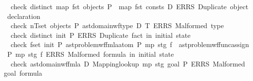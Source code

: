 \begin{isabellebody}
\ \ check\ {\isacharparenleft}{\kern0pt}distinct\ {\isacharparenleft}{\kern0pt}map\ fst\ {\isacharparenleft}{\kern0pt}objects\ P{\isacharparenright}{\kern0pt}\ {\isacharat}{\kern0pt}\ map\ fst\ {\isacharparenleft}{\kern0pt}consts\ D{\isacharparenright}{\kern0pt}{\isacharparenright}{\kern0pt}{\isacharparenright}{\kern0pt}\ {\isacharparenleft}{\kern0pt}ERRS\ {\isacharprime}{\kern0pt}{\isacharprime}{\kern0pt}Duplicate\ object\ declaration{\isacharprime}{\kern0pt}{\isacharprime}{\kern0pt}{\isacharparenright}{\kern0pt}{\isacharsemicolon}{\kern0pt}\isanewline
\ \ check\ {\isacharparenleft}{\kern0pt}{\isacharparenleft}{\kern0pt}{\isasymforall}{\isacharparenleft}{\kern0pt}n{\isacharcomma}{\kern0pt}T{\isacharparenright}{\kern0pt}{\isasymin}set\ {\isacharparenleft}{\kern0pt}objects\ P{\isacharparenright}{\kern0pt}{\isachardot}{\kern0pt}\ ast{\isacharunderscore}{\kern0pt}domain{\isachardot}{\kern0pt}wf{\isacharunderscore}{\kern0pt}type\ D\ T{\isacharparenright}{\kern0pt}{\isacharparenright}{\kern0pt}\ {\isacharparenleft}{\kern0pt}ERRS\ {\isacharprime}{\kern0pt}{\isacharprime}{\kern0pt}Malformed\ type{\isacharprime}{\kern0pt}{\isacharprime}{\kern0pt}{\isacharparenright}{\kern0pt}{\isacharsemicolon}{\kern0pt}\isanewline
\ \ check\ {\isacharparenleft}{\kern0pt}distinct\ {\isacharparenleft}{\kern0pt}init\ P{\isacharparenright}{\kern0pt}{\isacharparenright}{\kern0pt}\ {\isacharparenleft}{\kern0pt}ERRS\ {\isacharprime}{\kern0pt}{\isacharprime}{\kern0pt}Duplicate\ fact\ in\ initial\ state{\isacharprime}{\kern0pt}{\isacharprime}{\kern0pt}{\isacharparenright}{\kern0pt}{\isacharsemicolon}{\kern0pt}\isanewline
\ \ check\ {\isacharparenleft}{\kern0pt}{\isasymforall}f{\isasymin}set\ {\isacharparenleft}{\kern0pt}init\ P{\isacharparenright}{\kern0pt}{\isachardot}{\kern0pt}\ ast{\isacharunderscore}{\kern0pt}problem{\isachardot}{\kern0pt}wf{\isacharunderscore}{\kern0pt}fmla{\isacharunderscore}{\kern0pt}atom{}{\isacharprime}{\kern0pt}\ P\ mp\ stg\ f\ {\isasymor}\ ast{\isacharunderscore}{\kern0pt}problem{\isachardot}{\kern0pt}wf{\isacharunderscore}{\kern0pt}func{\isacharunderscore}{\kern0pt}assign{\isacharprime}{\kern0pt}\ P\ mp\ stg\ f{\isacharparenright}{\kern0pt}\ {\isacharparenleft}{\kern0pt}ERRS\ {\isacharprime}{\kern0pt}{\isacharprime}{\kern0pt}Malformed\ formula\ in\ initial\ state{\isacharprime}{\kern0pt}{\isacharprime}{\kern0pt}{\isacharparenright}{\kern0pt}{\isacharsemicolon}{\kern0pt}\isanewline
\ \ check\ {\isacharparenleft}{\kern0pt}ast{\isacharunderscore}{\kern0pt}domain{\isachardot}{\kern0pt}wf{\isacharunderscore}{\kern0pt}fmla{\isacharprime}{\kern0pt}\ D\ {\isacharparenleft}{\kern0pt}Mapping{\isachardot}{\kern0pt}lookup\ mp{\isacharparenright}{\kern0pt}\ stg\ {\isacharparenleft}{\kern0pt}goal\ P{\isacharparenright}{\kern0pt}{\isacharparenright}{\kern0pt}\ {\isacharparenleft}{\kern0pt}ERRS\ {\isacharprime}{\kern0pt}{\isacharprime}{\kern0pt}Malformed\ goal\ formula{\isacharprime}{\kern0pt}{\isacharprime}{\kern0pt}{\isacharparenright}{\kern0pt}\isanewline

\end{isabellebody}
